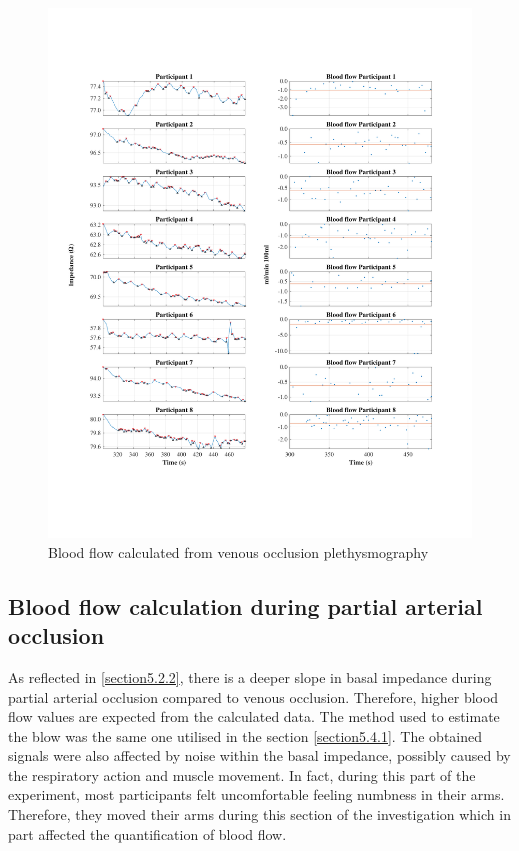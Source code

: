 \begin{figure}
	\includegraphics[width=\textwidth,height=\textheight,keepaspectratio,trim={0.5cm 0.5cm 2cm 2cm},clip]{figure12}    
	\caption{Blood flow calculated from venous occlusion plethysmography}
	\label{fig:blood_flow:venous_occlusion}
\end{figure}

\subsection{Blood flow calculation during partial arterial occlusion}
\label{section5.4.2}
As reflected in \ref{section5.2.2}, there is a deeper slope in basal impedance during partial arterial occlusion compared to venous occlusion. Therefore, higher blood flow values are expected from the calculated data. The method used to estimate the blow was the same one utilised in the section \ref{section5.4.1}. The obtained signals were also affected by noise within the basal impedance, possibly caused by the respiratory action and muscle movement. In fact, during this part of the experiment, most participants felt uncomfortable feeling numbness in their arms. Therefore, they moved their arms during this section of the investigation which in part affected the quantification of blood flow.

